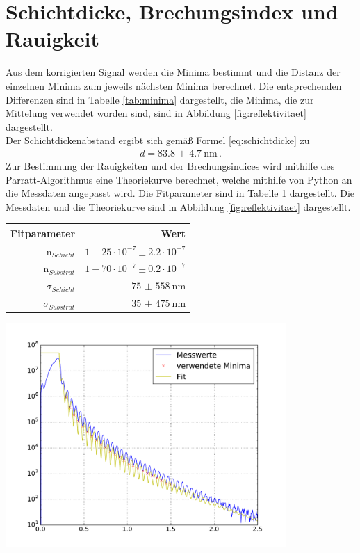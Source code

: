 \documentclass[captions=tableheading]{scrartcl}
\begin{document}
\section{Schichtdicke, Brechungsindex und Rauigkeit}
Aus dem korrigierten Signal werden die Minima bestimmt und die Distanz der einzelnen Minima zum jeweils nächsten Minima berechnet. Die entsprechenden Differenzen sind in Tabelle \ref{tab:minima} dargestellt, die Minima, die zur Mittelung verwendet worden sind, sind in Abbildung \ref{fig:reflektivitaet} dargestellt. \\
Der Schichtdickenabstand ergibt sich gemäß Formel \ref{eq:schichtdicke} zu
\begin{align*}
d=\SI{83.8(47)}{\nano \metre}\,.
\end{align*}
Zur Bestimmung der Rauigkeiten und der Brechungsindices wird mithilfe des Parratt-Algorithmus eine Theoriekurve berechnet, welche mithilfe von Python an die Messdaten angepasst wird. Die Fitparameter sind in Tabelle \ref{tab:fitparameter} dargestellt. Die Messdaten und die Theoriekurve sind in Abbildung \ref{fig:reflektivitaet} dargestellt.
\begin{table}[H]
	\centering
	\label{tab:fitparameter}
	\begin{tabular}{r r}
		\toprule
		Fitparameter & Wert \\
		\midrule
		n$_{Schicht}$ & $1 - 25\cdot10^{-7} \pm 2.2\cdot10^{-7}$ \\
		n$_{Substrat}$ & $1 - 70\cdot10^{-7}\pm 0.2\cdot10^{-7}$ \\
		$\sigma_{Schicht}$ &  $\SI{75(558)}{\nano\metre}$ \\
		$\sigma_{Substrat}$ & $\SI{35(475)}{\nano\metre}$ \\
		\bottomrule
	\end{tabular}
\end{table}

\begin{center}
	\includegraphics[width=0.8\textwidth]{images/reflectrometry.pdf}
	\label{fig:reflektivitaet}
\end{center}
\end{document}
